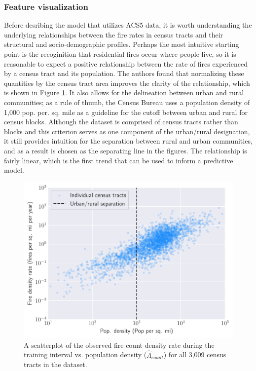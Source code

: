 \documentclass{svjour3}
\begin{document}
  \subsubsection{Feature visualization}
  Before desribing the model that utilizes ACS5 data, it is worth understanding the underlying relationships between the fire rates in census tracts and their structural and socio-demographic profiles. Perhaps the most intuitive starting point is the recoginition that residential fires occur where people live, so it is reasonable to expect a positive relationship between the rate of fires experienced by a census tract and its population. The authors found that normalizing these quantities by the census tract area improves the clarity of the relationship, which is shown in Figure \ref{fig:pop_relation}. It also allows for the delineation between urban and rural communities; as a rule of thumb, the Census Bureau   \cite{ratcliffe2016defining} uses a population density of 1,000 pop. per. sq. mile as a guideline for the cutoff between urban and rural for census blocks. Although the dataset is comprised of census tracts rather than blocks and this criterion serves as one component of the urban/rural designation, it still provides intuition for the separation between rural and urban communities, and as a result is chosen as the separating line in the figures. The relationship is fairly linear, which is the first trend that can be used to inform a predictive model.
    
     \begin{figure}[htb] \centering
    \includegraphics[width=.75\textwidth]{figures/pop_relation.pdf}
    \caption{A scatterplot of the observed fire count density rate during the training interval vs. population density ($\hat\Lambda_{count}$) for all 3,009 census tracts in the dataset. }
    \label{fig:pop_relation}
    \end{figure}
  
\end{document}
